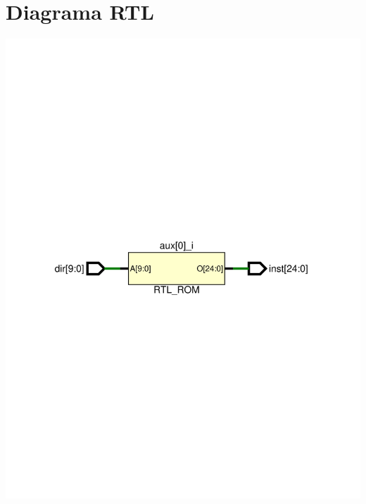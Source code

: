 \documentclass[8pt,executivepaper]{article}
\begin{document}
\section{Diagrama RTL}
\begin{center}
  \includegraphics[scale=0.5]{sources/schematicRTL.pdf}
\end{center}
\end{document}
